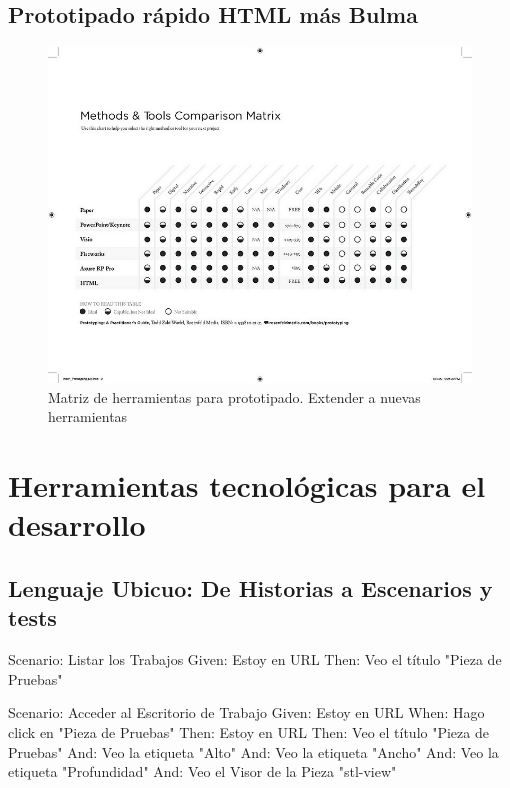 \subsection{Prototipado rápido HTML más Bulma}

\begin{figure}
\centering
\includegraphics[width=16cm]{Img/UX/UX-matrix.jpg}
\caption[Proto-persona (optional short caption)]{\label{us_figure} Matriz de herramientas para prototipado. Extender a nuevas herramientas}
\end{figure}

\section{Herramientas tecnológicas para el desarrollo}

\subsection{Lenguaje Ubicuo: De Historias a Escenarios y tests}

Scenario: Listar los Trabajos\vskip0mm
  Given: Estoy en URL\vskip0mm
  Then: Veo el título "Pieza de Pruebas"\vskip10mm
 
Scenario: Acceder al Escritorio de Trabajo\vskip0mm
  Given: Estoy en URL\vskip0mm
  When: Hago click en "Pieza de Pruebas"\vskip0mm
  Then: Estoy en URL\vskip0mm
  Then: Veo el título "Pieza de Pruebas"\vskip0mm
  And: Veo la etiqueta "Alto"\vskip0mm
  And: Veo la etiqueta "Ancho"\vskip0mm
  And: Veo la etiqueta "Profundidad"\vskip0mm
  And: Veo el Visor de la Pieza "stl-view"
  
